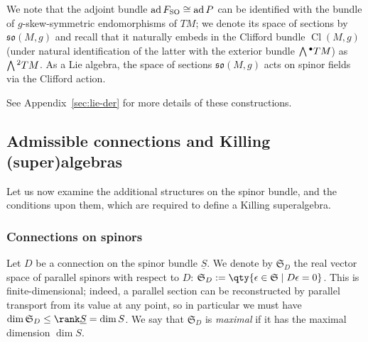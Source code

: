 \documentclass[10pt,a4paper]{amsart}
\numberwithin{equation}{section}
\newcommand{\fso}{\mathfrak{so}}
\newcommand{\fS}{\mathfrak{S}}
\newcommand{\Sbundle}{\underline{S}}
\newcommand{\Wedge}{\mathchoice{{\textstyle\bigwedge}}{\bigwedge}{\bigwedge}{\bigwedge}}	%
\newcommand{\1}{\mathbbm{1}}
\DeclareMathOperator{\Cl}{Cl}
\DeclareMathOperator{\ad}{ad}
\begin{document}
We note that the adjoint bundle $\ad F_{\rm SO}\cong\ad P$ can be identified with the bundle of $g$-skew-symmetric endomorphisms of $TM$; we denote its space of sections by $\fso(M,g)$ and recall that it naturally embeds in the Clifford bundle $\Cl(M,g)$ (under natural identification of the latter with the exterior bundle $\Wedge^\bullet TM$) as $\Wedge^2 TM$. As a Lie algebra, the space of sections $\fso(M,g)$ acts on spinor fields via the Clifford action.

See Appendix~\ref{sec:lie-der} for more details of these constructions.

\subsection{Admissible connections and Killing (super)algebras}
\label{sec:admissible-ksa}

Let us now examine the additional structures on the spinor bundle, and the conditions upon them, which are required to define a Killing superalgebra.

\subsubsection{Connections on spinors}

Let $D$ be a connection on the spinor bundle $\Sbundle$. We denote by $\fS_D$ the real vector space of parallel spinors with respect to $D$:
$\fS_D := \qty{\epsilon\in\fS\mid D\epsilon = 0}$.
This is finite-dimensional; indeed, a parallel section can be reconstructed by parallel transport from its value at any point, so in particular we must have $\dim\fS_D\leq\rank\Sbundle=\dim S$. We say that $\fS_D$ is \emph{maximal} if it has the maximal dimension $\dim S$.
\end{document}
